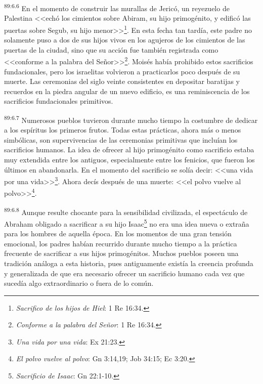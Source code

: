 \par
\textsuperscript{89:6.6} En el momento de construir las murallas de Jericó, un reyezuelo de Palestina <<echó los cimientos sobre Abiram, su hijo primogénito, y edificó las puertas sobre Segub, su hijo menor>>\footnote{\textit{Sacrifico de los hijos de Hiel}: 1 Re 16:34.}. En esta fecha tan tardía, este padre no solamente puso a dos de sus hijos vivos en los agujeros de los cimientos de las puertas de la ciudad, sino que su acción fue también registrada como <<conforme a la palabra del Señor>>\footnote{\textit{Conforme a la palabra del Señor}: 1 Re 16:34.}. Moisés había prohibido estos sacrificios fundacionales, pero los israelitas volvieron a practicarlos poco después de su muerte. Las ceremonias del siglo veinte consistentes en depositar baratijas y recuerdos en la piedra angular de un nuevo edificio, es una reminiscencia de los sacrificios fundacionales primitivos.

\par
\textsuperscript{89:6.7} Numerosos pueblos tuvieron durante mucho tiempo la costumbre de dedicar a los espíritus los primeros frutos. Todas estas prácticas, ahora más o menos simbólicas, son supervivencias de las ceremonias primitivas que incluían los sacrificios humanos. La idea de ofrecer al hijo primogénito como sacrificio estaba muy extendida entre los antiguos, especialmente entre los fenicios, que fueron los últimos en abandonarla. En el momento del sacrificio se solía decir: <<una vida por una vida>>\footnote{\textit{Una vida por una vida}: Ex 21:23.}. Ahora decís después de una muerte: <<el polvo vuelve al polvo>>\footnote{\textit{El polvo vuelve al polvo}: Gn 3:14,19; Job 34:15; Ec 3:20.}.

\par
\textsuperscript{89:6.8} Aunque resulte chocante para la sensibilidad civilizada, el espectáculo de Abraham obligado a sacrificar a su hijo Isaac\footnote{\textit{Sacrificio de Isaac}: Gn 22:1-10.} no era una idea nueva o extraña para los hombres de aquella época. En los momentos de una gran tensión emocional, los padres habían recurrido durante mucho tiempo a la práctica frecuente de sacrificar a sus hijos primogénitos. Muchos pueblos poseen una tradición análoga a esta historia, pues antiguamente existía la creencia profunda y generalizada de que era necesario ofrecer un sacrificio humano cada vez que sucedía algo extraordinario o fuera de lo común.

